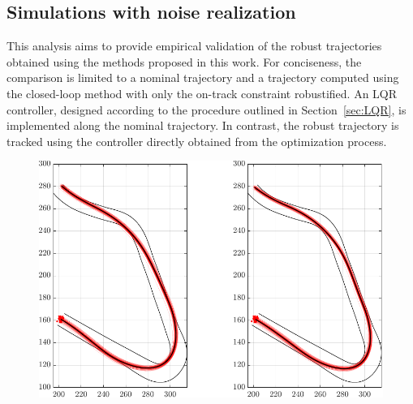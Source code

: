 \subsection{Simulations with noise realization}
This analysis aims to provide empirical validation of the robust trajectories obtained using the methods proposed in this work. For conciseness, the comparison is limited to a nominal trajectory and a trajectory computed using the closed-loop method with only the on-track constraint robustified.
An LQR controller, designed according to the procedure outlined in Section~\ref{sec:LQR}, is implemented along the nominal trajectory. In contrast, the robust trajectory is tracked using the controller directly obtained from the optimization process.

\begin{figure}
	\centering
	\includegraphics{Fig/olcl_traj_strings.pdf}
	\caption{}
	\label{fig:traj_strings}
\end{figure}